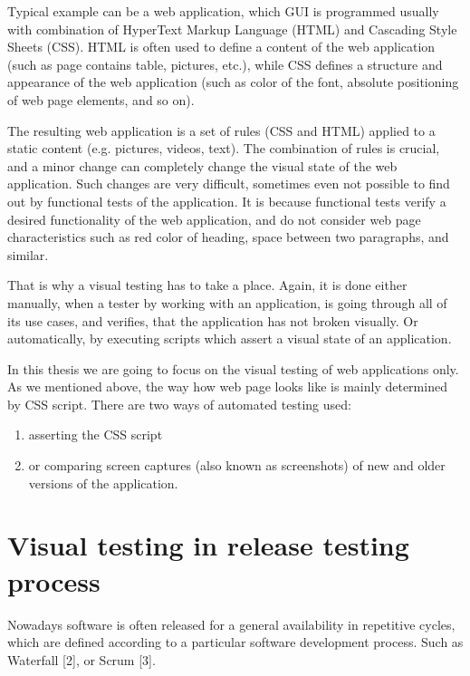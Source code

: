 \documentclass[11pt,oneside,final]{fithesis2}
\begin{document}
    Typical example can be a web application, which GUI is programmed usually with combination of HyperText Markup Language (HTML) and Cascading Style Sheets (CSS). 
    HTML is often used to define a content of the web application (such as page contains table, pictures, etc.), while CSS defines a structure and appearance of the 
    web application (such as color of the font, absolute positioning of web page elements, and so on).
    
    The resulting web application is a set of rules (CSS and HTML) applied to a static content (e.g. pictures, videos, text). The combination of rules is crucial, and a minor change
    can completely change the visual state of the web application. Such changes are very difficult, sometimes even not possible to find out by functional tests of the application. 
    It is because functional tests verify a desired functionality of the web application, and do not consider web page characteristics such as red color of heading, 
    space between two paragraphs, and similar.
    
    That is why a visual testing has to take a place. Again, it is done either manually, when a tester by working with an application, is going through all of its use cases, and verifies, that
    the application has not broken visually. Or automatically, by executing scripts which assert a visual state of an application.
    
    In this thesis we are going to focus on the visual testing of web applications only. As we mentioned above, the way how web page looks like is mainly determined by CSS script.
    There are two ways of automated testing used:
    \begin{enumerate}
      \item asserting the CSS script
      \item or comparing screen captures (also known as screenshots) of new and older versions of the application.
    \end{enumerate}
     
  \section{Visual testing in release testing process}
  \label{sec:visual-testing-in-release-process}
  Nowadays software is often released for a general availability in repetitive cycles, which are defined according to a particular software development process. 
  Such as Waterfall [2], or Scrum [3].
  
\end{document}
